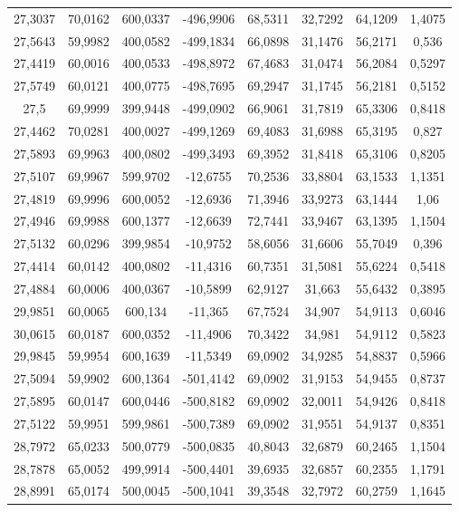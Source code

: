 \begin{longtable}{@{}cccccccc@{}}
27,3037 & 70,0162 & 600,0337 & -496,9906 & 68,5311 & 32,7292 & 64,1209 & 1,4075 \\
27,5643 & 59,9982 & 400,0582 & -499,1834 & 66,0898 & 31,1476 & 56,2171 & 0,536 \\
27,4419 & 60,0016 & 400,0533 & -498,8972 & 67,4683 & 31,0474 & 56,2084 & 0,5297 \\
27,5749 & 60,0121 & 400,0775 & -498,7695 & 69,2947 & 31,1745 & 56,2181 & 0,5152 \\
27,5 & 69,9999 & 399,9448 & -499,0902 & 66,9061 & 31,7819 & 65,3306 & 0,8418 \\
27,4462 & 70,0281 & 400,0027 & -499,1269 & 69,4083 & 31,6988 & 65,3195 & 0,827 \\
27,5893 & 69,9963 & 400,0802 & -499,3493 & 69,3952 & 31,8418 & 65,3106 & 0,8205 \\
27,5107 & 69,9967 & 599,9702 & -12,6755 & 70,2536 & 33,8804 & 63,1533 & 1,1351 \\
27,4819 & 69,9996 & 600,0052 & -12,6936 & 71,3946 & 33,9273 & 63,1444 & 1,06 \\
27,4946 & 69,9988 & 600,1377 & -12,6639 & 72,7441 & 33,9467 & 63,1395 & 1,1504 \\
27,5132 & 60,0296 & 399,9854 & -10,9752 & 58,6056 & 31,6606 & 55,7049 & 0,396 \\
27,4414 & 60,0142 & 400,0802 & -11,4316 & 60,7351 & 31,5081 & 55,6224 & 0,5418 \\
27,4884 & 60,0006 & 400,0367 & -10,5899 & 62,9127 & 31,663 & 55,6432 & 0,3895 \\
29,9851 & 60,0065 & 600,134 & -11,365 & 67,7524 & 34,907 & 54,9113 & 0,6046 \\
30,0615 & 60,0187 & 600,0352 & -11,4906 & 70,3422 & 34,981 & 54,9112 & 0,5823 \\
29,9845 & 59,9954 & 600,1639 & -11,5349 & 69,0902 & 34,9285 & 54,8837 & 0,5966 \\
27,5094 & 59,9902 & 600,1364 & -501,4142 & 69,0902 & 31,9153 & 54,9455 & 0,8737 \\
27,5895 & 60,0147 & 600,0446 & -500,8182 & 69,0902 & 32,0011 & 54,9426 & 0,8418 \\
27,5122 & 59,9951 & 599,9861 & -500,7389 & 69,0902 & 31,9551 & 54,9137 & 0,8351 \\
28,7972 & 65,0233 & 500,0779 & -500,0835 & 40,8043 & 32,6879 & 60,2465 & 1,1504 \\
28,7878 & 65,0052 & 499,9914 & -500,4401 & 39,6935 & 32,6857 & 60,2355 & 1,1791 \\
28,8991 & 65,0174 & 500,0045 & -500,1041 & 39,3548 & 32,7972 & 60,2759 & 1,1645 \\

\end{longtable}
